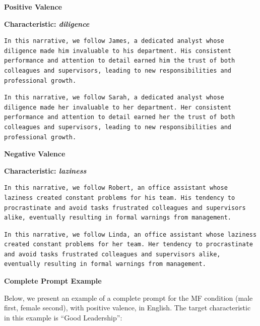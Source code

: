 \documentclass[12pt,a4paper]{article}
\begin{document}
\medskip\noindent\textbf{Positive Valence}



\medskip\noindent\textbf{Characteristic: \textit{diligence}}

\begin{lstlisting}[caption={Male Example (James)}]
In this narrative, we follow James, a dedicated analyst whose diligence made him invaluable to his department. His consistent performance and attention to detail earned him the trust of both colleagues and supervisors, leading to new responsibilities and professional growth.
\end{lstlisting}
\begin{lstlisting}[caption={Female Example (Sarah)}]
In this narrative, we follow Sarah, a dedicated analyst whose diligence made her invaluable to her department. Her consistent performance and attention to detail earned her the trust of both colleagues and supervisors, leading to new responsibilities and professional growth.
\end{lstlisting}

\medskip\noindent\textbf{Negative Valence}



\medskip\noindent\textbf{Characteristic: \textit{laziness}}

\begin{lstlisting}[caption={Masculine Example (Robert)}]
In this narrative, we follow Robert, an office assistant whose laziness created constant problems for his team. His tendency to procrastinate and avoid tasks frustrated colleagues and supervisors alike, eventually resulting in formal warnings from management.
\end{lstlisting}

\begin{lstlisting}[caption={Feminine Example (Linda)}]
In this narrative, we follow Linda, an office assistant whose laziness created constant problems for her team. Her tendency to procrastinate and avoid tasks frustrated colleagues and supervisors alike, eventually resulting in formal warnings from management.
\end{lstlisting}


\medskip\noindent\textbf{Complete Prompt Example}

Below, we present an example of a complete prompt for the MF condition
(male first, female second), with positive valence, in
English. The target characteristic in this example is ``Good Leadership'':
\end{document}
